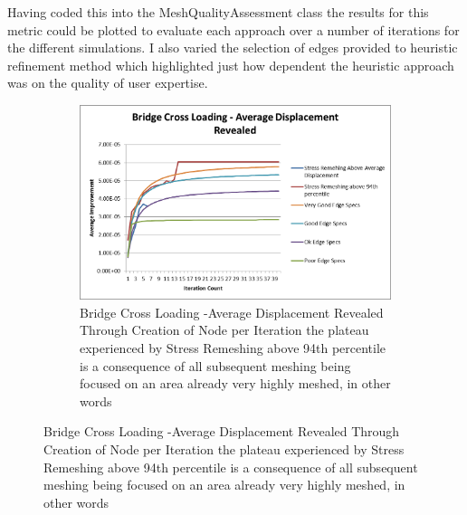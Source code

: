 \noindent
Having coded this into the MeshQualityAssessment class the results for this metric could be plotted to evaluate each approach over a number of iterations for the different simulations. I also varied the selection of edges provided to heuristic refinement method which highlighted just how dependent the heuristic approach was on the quality of user expertise.

\begin{figure}[!h]
\centering
\begin{subfigure}{.5\textwidth}
  \centering
  \includegraphics[width=0.9\linewidth]{../Graphics/Graphs/BridgeCrossLoadingAverageDisplacementRevealed.png}
  \caption{Bridge Cross Loading -Average Displacement Revealed Through Creation of Node per Iteration the plateau experienced by Stress Remeshing above 94th percentile is a consequence of all subsequent meshing being focused on an area already very highly meshed, in other words}
  \label{fig:sub1}
\end{subfigure}%
\label{fig:test}
\end{figure}

